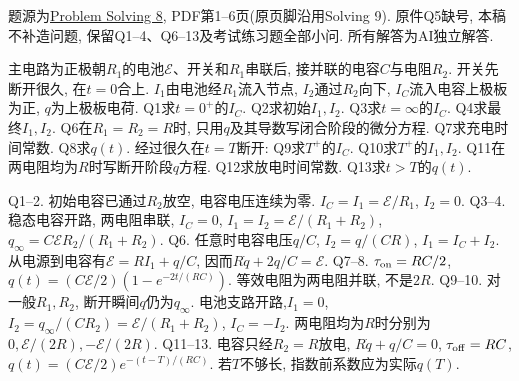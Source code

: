 题源为\href{https://ocw.mit.edu/courses/8-02-physics-ii-electricity-and-magnetism-spring-2007/resources/solving08/}{Problem Solving 8}, PDF第1--6页(原页脚沿用Solving 9). 原件Q5缺号, 本稿不补造问题, 保留Q1--4、Q6--13及考试练习题全部小问. 所有解答为AI独立解答.

\begin{exercise}
主电路为正极朝$R_1$的电池$\mathcal E$、开关和$R_1$串联后, 接并联的电容$C$与电阻$R_2$. 开关先断开很久, 在$t=0$合上. $I_1$由电池经$R_1$流入节点, $I_2$通过$R_2$向下, $I_C$流入电容上极板为正, $q$为上极板电荷.
Q1求$t=0^+$的$I_C$.
Q2求初始$I_1,I_2$.
Q3求$t=\infty$的$I_C$.
Q4求最终$I_1,I_2$.
Q6在$R_1=R_2=R$时, 只用$q$及其导数写闭合阶段的微分方程.
Q7求充电时间常数.
Q8求$q(t)$.
经过很久在$t=T$断开:
Q9求$T^+$的$I_C$.
Q10求$T^+$的$I_1,I_2$.
Q11在两电阻均为$R$时写断开阶段$q$方程.
Q12求放电时间常数.
Q13求$t>T$的$q(t)$.
\end{exercise}
\begin{solution}
Q1--2. 初始电容已通过$R_2$放空, 电容电压连续为零. $I_C=I_1=\mathcal E/R_1$, $I_2=0$.
Q3--4. 稳态电容开路, 两电阻串联, $I_C=0$, $I_1=I_2=\mathcal E/(R_1+R_2)$, $q_\infty=C\mathcal E R_2/(R_1+R_2)$.
Q6. 任意时电容电压$q/C$, $I_2=q/(CR)$, $I_1=I_C+I_2$. 从电源到电容有$\mathcal E=RI_1+q/C$, 因而$R\dot q+2q/C=\mathcal E$.
Q7--8. $\tau_{\rm on}=RC/2$, $q(t)=(C\mathcal E/2)(1-e^{-2t/(RC)})$. 等效电阻为两电阻并联, 不是$2R$.
Q9--10. 对一般$R_1,R_2$, 断开瞬间$q$仍为$q_\infty$. 电池支路开路,$I_1=0$, $I_2=q_\infty/(CR_2)=\mathcal E/(R_1+R_2)$, $I_C=-I_2$. 两电阻均为$R$时分别为$0,\mathcal E/(2R),-\mathcal E/(2R)$.
Q11--13. 电容只经$R_2=R$放电, $R\dot q+q/C=0$, $\tau_{\rm off}=RC$, $q(t)=(C\mathcal E/2)e^{-(t-T)/(RC)}$. 若$T$不够长, 指数前系数应为实际$q(T)$.
\begin{center}\end{center}
\end{solution}

